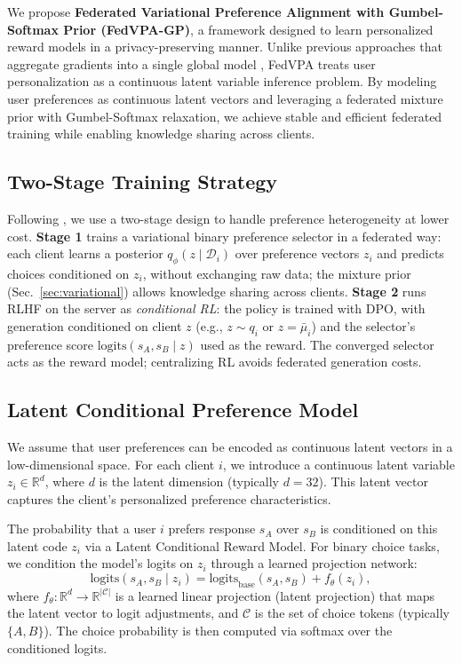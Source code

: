 We propose \textbf{Federated Variational Preference Alignment with Gumbel-Softmax Prior (FedVPA-GP)}, a framework designed to learn personalized reward models in a privacy-preserving manner. Unlike previous approaches that aggregate gradients into a single global model \citep{wu2024towards}, FedVPA treats user personalization as a continuous latent variable inference problem. By modeling user preferences as continuous latent vectors and leveraging a federated mixture prior with Gumbel-Softmax relaxation, we achieve stable and efficient federated training while enabling knowledge sharing across clients.

\subsection{Two-Stage Training Strategy}
Following \citet{wu2024towards}, we use a two-stage design to handle preference heterogeneity at lower cost. \textbf{Stage 1} trains a variational binary preference selector in a federated way: each client learns a posterior $q_\phi(z \mid \mathcal{D}_i)$ over preference vectors $z_i$ and predicts choices conditioned on $z_i$, without exchanging raw data; the mixture prior (Sec.~\ref{sec:variational}) allows knowledge sharing across clients. \textbf{Stage 2} runs RLHF \citep{rafailov2023direct} on the server as \textit{conditional RL}: the policy is trained with DPO, with generation conditioned on client $z$ (e.g., $z \sim q_i$ or $z = \bar{\mu}_i$) and the selector's preference score $\text{logits}(s_A, s_B \mid z)$ used as the reward. The converged selector acts as the reward model; centralizing RL avoids federated generation costs.

\subsection{Latent Conditional Preference Model}
We assume that user preferences can be encoded as continuous latent vectors in a low-dimensional space. For each client $i$, we introduce a continuous latent variable $z_i \in \mathbb{R}^d$, where $d$ is the latent dimension (typically $d=32$). This latent vector captures the client's personalized preference characteristics.

The probability that a user $i$ prefers response $s_A$ over $s_B$ is conditioned on this latent code $z_i$ via a Latent Conditional Reward Model. For binary choice tasks, we condition the model's logits on $z_i$ through a learned projection network:
\begin{equation}
    \text{logits}(s_A, s_B \mid z_i) = \text{logits}_{\text{base}}(s_A, s_B) + f_\theta(z_i),
\end{equation}
where $f_\theta: \mathbb{R}^d \to \mathbb{R}^{|\mathcal{C}|}$ is a learned linear projection (latent projection) that maps the latent vector to logit adjustments, and $\mathcal{C}$ is the set of choice tokens (typically $\{A, B\}$). The choice probability is then computed via softmax over the conditioned logits.

